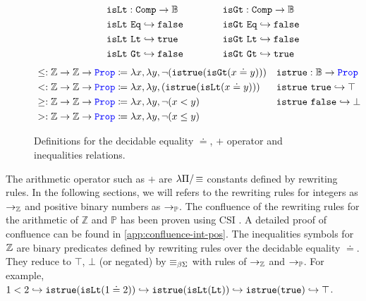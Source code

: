 \begin{figure}
\[\begin{array}{l@{\hspace{4em}}l@{\hspace{4em}}l}
&
\begin{aligned}
  &\tt{isLt} : \tt{Comp} \ra \bb{B} \\
  &\tt{isLt}~\tt{Eq} \re \tt{false} \\
  &\tt{isLt}~\tt{Lt} \re \tt{true} \\
  &\tt{isLt}~\tt{Gt} \re \tt{false} \\
\end{aligned}
&
\begin{aligned}
  &\tt{isGt} : \tt{Comp} \ra \bb{B} \\
  &\tt{isGt}~\tt{Eq} \re \tt{false} \\
  &\tt{isGt}~\tt{Lt} \re \tt{false} \\
  &\tt{isGt}~\tt{Gt} \re \tt{true} \\
\end{aligned}
\end{array}
\]
\noindent
\begin{align*}
&\leq: \bb{Z} \ra \bb{Z} \ra \prop  \coloneq \lambda x,\lambda y, \neg (\tt{istrue}(\tt{isGt}(x \doteq y))) & &\tt{istrue} : \bb{B} \ra \prop \\
&<: \bb{Z} \ra \bb{Z} \ra \prop  \coloneq \lambda x,\lambda y, (\tt{istrue}(\tt{isLt}(x \doteq y))) & &\tt{istrue}~\tt{true} \re \top \\
&\geq: \bb{Z} \ra \bb{Z} \ra \prop  \coloneq \lambda x,\lambda y, \neg (x < y) & &\tt{istrue}~\tt{false} \re \bot \\
&>: \bb{Z} \ra \bb{Z} \ra \prop  \coloneq \lambda x,\lambda y, \neg (x \leq y) & & \\
\end{align*}
\caption{Definitions for the decidable equality $\doteq$, $+$ operator and inequalities relations.}
\label{fig:arith-ops}
\end{figure}

The arithmetic operator such as $+$ are $\lpm$ constants defined by rewriting rules. In the following sections, we will refers to the rewriting rules for integers as $\ra_\bb{Z}$ and positive binary numbers as $\ra_\bb{P}$.
The confluence of the rewriting rules for the arithmetic of $\mathbb{Z}$ and $\mathbb{P}$ has been proven using CSI \cite{CSI}. A detailed proof of confluence can be found in \cref{app:confluence-int-pos}.
The inequalities symbols for $\bb{Z}$ are binary predicates defined by rewriting rules over the decidable equality $\doteq$. They reduce to $\top$, $\bot$ (or negated) by $\equivL$ with rules of $\ra_\bb{Z}$ and $\ra_\bb{P}$.
For example, $1 < 2 \hookrightarrow \tt{istrue}(\tt{isLt}(1 \doteq 2)) \hookrightarrow \tt{istrue}(\tt{isLt}(\tt{Lt})) \hookrightarrow \tt{istrue}(\tt{true}) \hookrightarrow \top$.

